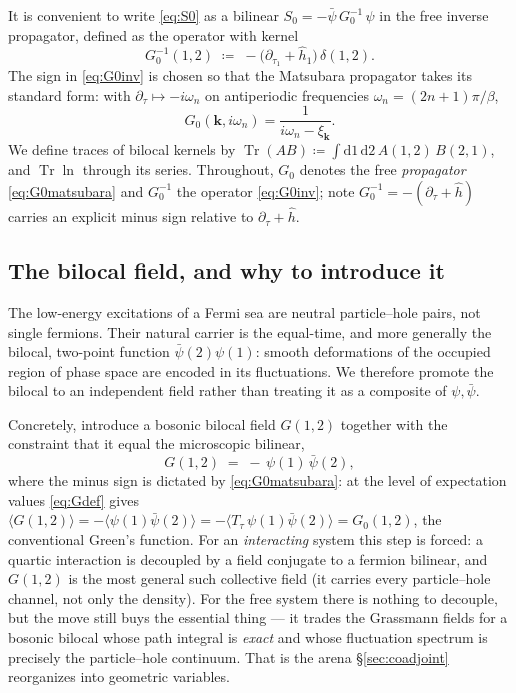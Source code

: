 \documentclass[11pt]{article}
\theoremstyle{remark}
\begin{document}
It is convenient to write \eqref{eq:S0} as a bilinear $S_0=-\bar{\psi}\,G_0^{-1}\,\psi$
in the free inverse propagator, defined as the operator with kernel
\begin{equation}
\label{eq:G0inv}
G_0^{-1}(1,2) \;\coloneqq\; -\big(\partial_{\tau_1}+\hat h_1\big)\,\delta(1,2).
\end{equation}
The sign in \eqref{eq:G0inv} is chosen so that the Matsubara propagator takes
its standard form: with $\partial_\tau \mapsto -i\omega_n$ on antiperiodic
frequencies $\omega_n=(2n+1)\pi/\beta$,
\begin{equation}
\label{eq:G0matsubara}
G_0(\bm{k},i\omega_n) = \frac{1}{i\omega_n-\xi_{\bm{k}}}.
\end{equation}
We define traces of bilocal kernels by
$\operatorname{Tr}(AB)\coloneqq \int \mathrm{d}1\,\mathrm{d}2\, A(1,2)\,B(2,1)$, and $\operatorname{Tr}\ln$ through its
series. Throughout, $G_0$ denotes the free \emph{propagator}
\eqref{eq:G0matsubara} and $G_0^{-1}$ the operator \eqref{eq:G0inv}; note
$G_0^{-1}=-(\partial_\tau+\hat h)$ carries an explicit minus sign relative to
$\partial_\tau+\hat h$.

\subsection{The bilocal field, and why to introduce it}

The low-energy excitations of a Fermi sea are neutral particle--hole pairs, not
single fermions. Their natural carrier is the equal-time, and more generally the
bilocal, two-point function $\bar{\psi}(2)\psi(1)$: smooth deformations of the
occupied region of phase space are encoded in its fluctuations. We therefore
promote the bilocal to an independent field rather than treating it as a
composite of $\psi,\bar{\psi}$.

Concretely, introduce a bosonic bilocal field $G(1,2)$ together with the
constraint that it equal the microscopic bilinear,
\begin{equation}
\label{eq:Gdef}
G(1,2) \;=\; -\,\psi(1)\,\bar{\psi}(2),
\end{equation}
where the minus sign is dictated by \eqref{eq:G0matsubara}: at the level of
expectation values \eqref{eq:Gdef} gives
$\langle G(1,2)\rangle=-\langle\psi(1)\bar{\psi}(2)\rangle=-\langle T_\tau\,\psi(1)\bar{\psi}(2)\rangle=G_0(1,2)$,
the conventional Green's function. For an \emph{interacting} system this step is
forced: a quartic interaction is decoupled by a field conjugate to a fermion
bilinear, and $G(1,2)$ is the most general such collective field (it carries
every particle--hole channel, not only the density). For the free system there
is nothing to decouple, but the move still buys the essential thing --- it trades
the Grassmann fields for a bosonic bilocal whose path integral is \emph{exact}
and whose fluctuation spectrum is precisely the particle--hole continuum. That
is the arena \S\ref{sec:coadjoint} reorganizes into geometric variables.
\end{document}
